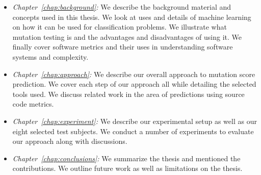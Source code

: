 \begin{itemize}
  \item \emph{Chapter~\ref{chap:background}:} We describe the background material and concepts used in this thesis. We look at uses and details of machine learning on how it can be used for classification problems. We illustrate what mutation testing is and  the advantages and disadvantages of using it. We finally cover software metrics and their uses in understanding software systems and complexity.
  \item \emph{Chapter~\ref{chap:approach}:} We describe our overall approach to mutation score prediction. We cover each step of our approach all while detailing the selected tools used. We discuss related work in the area of predictions using source code metrics.
  \item \emph{Chapter~\ref{chap:experiment}:} We describe our experimental setup as well as our eight selected test subjects. We conduct a number of experiments to evaluate our approach along with discussions.
  \item \emph{Chapter~\ref{chap:conclusions}:} We summarize the thesis and mentioned the contributions. We outline future work as well as limitations on the thesis.
\end{itemize}
